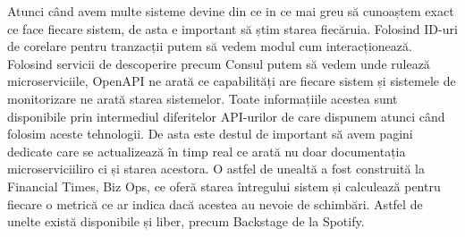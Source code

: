 Atunci când avem multe sisteme devine din ce in ce mai greu să cunoaștem exact ce face fiecare sistem,
de asta e important să știm starea fiecăruia. Folosind ID-uri de corelare pentru tranzacții
putem să vedem modul cum interacționează. Folosind servicii de descoperire precum Consul
putem să vedem unde rulează microserviciile, OpenAPI ne arată ce capabilități are fiecare sistem
și sistemele de monitorizare ne arată starea sistemelor. Toate informațiile acestea sunt
disponibile prin intermediul diferitelor API-urilor de care dispunem atunci când folosim aceste
tehnologii. De asta este destul de important să avem pagini dedicate care se actualizează 
în timp real ce arată nu doar documentația microserviciiliro ci și starea acestora.
O astfel de unealtă a fost construită la Financial Times, Biz Ops, ce oferă starea întregului
sistem și calculează pentru fiecare o metrică ce ar indica dacă acestea au nevoie de 
schimbări. Astfel de unelte există disponibile și liber, precum Backstage de la Spotify.

